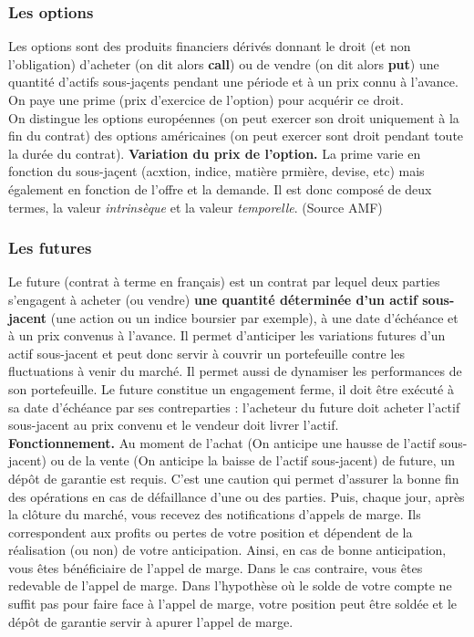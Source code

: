 \documentclass[a4paper]{article}
\begin{document}
\subsubsection{Les options}
Les options sont des produits financiers dérivés donnant le droit (et non l'obligation) d'acheter (on dit alors \textbf{call}) ou de vendre (on dit alors \textbf{put}) une quantité d'actifs sous-jaçents pendant une période et à un prix connu à l'avance. On paye une prime (prix d'exercice de l'option) pour acquérir ce droit. \\
On distingue les options européennes (on peut exercer son droit uniquement à la fin du contrat) des options américaines (on peut exercer sont droit pendant toute la durée du contrat).
\vspace{2mm} 
\textbf{Variation du prix de l'option.} La prime varie en fonction du sous-jaçent (acxtion, indice, matière prmière, devise, etc) mais également en fonction de l'offre et la demande. Il est donc composé de deux termes, la valeur \textit{intrinsèque} et la valeur \textit{temporelle}. (Source AMF)
\subsubsection{Les futures}
Le future (contrat à terme en français) est un contrat par lequel deux parties s’engagent à acheter (ou vendre) \textbf{une quantité déterminée d’un actif sous-jacent} (une action ou un indice boursier par exemple), à une date d’échéance et à un prix convenus à l’avance. Il permet d’anticiper les variations futures d’un actif sous-jacent et peut donc servir à couvrir un portefeuille contre les fluctuations à venir du marché. Il permet aussi de dynamiser les performances de son portefeuille. Le future constitue un engagement ferme, il doit être exécuté à sa date d’échéance par ses contreparties : l’acheteur du future doit acheter l’actif sous-jacent au prix convenu et le vendeur doit livrer l’actif.
\vspace{2mm} \\
\textbf{Fonctionnement.} Au moment de l’achat (On anticipe une hausse de l’actif sous-jacent) ou de la vente (On anticipe la baisse de l’actif sous-jacent) de future, un dépôt de garantie est requis. C’est une caution qui permet d’assurer la bonne fin des opérations en cas de défaillance d’une ou des parties. Puis, chaque jour, après la clôture du marché, vous recevez des notifications d’appels de marge. Ils correspondent aux profits ou pertes de votre position et dépendent de la réalisation (ou non) de votre anticipation. Ainsi, en cas de bonne anticipation, vous êtes bénéficiaire de l’appel de marge. Dans le cas contraire, vous êtes redevable de l’appel de marge. Dans l’hypothèse où le solde de votre compte ne suffit pas pour faire face à l’appel de marge, votre position peut être soldée et le dépôt de garantie servir à apurer l’appel de marge.
\end{document}
